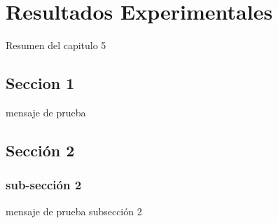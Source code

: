 \chapter{Resultados Experimentales}
\label{capitulo5}

Resumen del capitulo 5

\section{Seccion 1}
mensaje de prueba

\section{Sección 2}
\subsection{sub-sección 2}
mensaje de prueba subsección 2